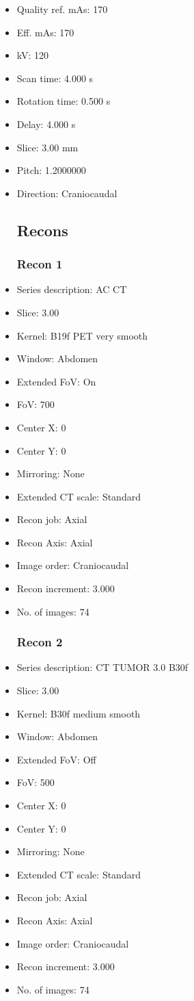 \documentclass[12pt]{article}
\begin{document}
\begin{itemize}[noitemsep]
\subsection{Scan}
\item Quality ref. mAs: 170\item Eff. mAs: 170\item kV: 120\item Scan time: 4.000 s\item Rotation time: 0.500 s\item Delay: 4.000 s\item Slice: 3.00 mm\item Pitch: 1.2000000\item Direction: Craniocaudal\subsection{Recons}

\subsubsection{Recon 1}
\item Series description: AC CT
\item Slice: 3.00
\item Kernel: B19f PET very smooth
\item Window: Abdomen
\item Extended FoV: On
\item FoV: 700
\item Center X: 0
\item Center Y: 0
\item Mirroring: None
\item Extended CT scale: Standard
\item Recon job: Axial
\item Recon Axis: Axial
\item Image order: Craniocaudal
\item Recon increment: 3.000
\item No. of images: 74
\subsubsection{Recon 2}
\item Series description: CT TUMOR 3.0 B30f
\item Slice: 3.00
\item Kernel: B30f medium smooth
\item Window: Abdomen
\item Extended FoV: Off
\item FoV: 500
\item Center X: 0
\item Center Y: 0
\item Mirroring: None
\item Extended CT scale: Standard
\item Recon job: Axial
\item Recon Axis: Axial
\item Image order: Craniocaudal
\item Recon increment: 3.000
\item No. of images: 74

\end{itemize}
\end{document}

